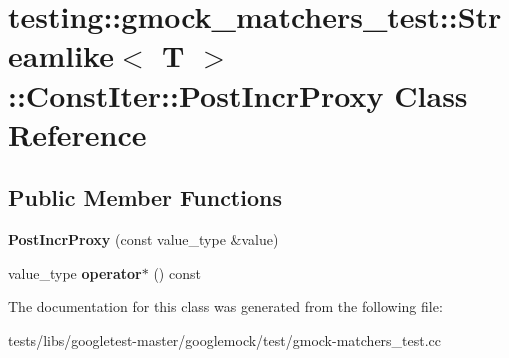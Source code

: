 \hypertarget{classtesting_1_1gmock__matchers__test_1_1Streamlike_1_1ConstIter_1_1PostIncrProxy}{}\section{testing\+:\+:gmock\+\_\+matchers\+\_\+test\+:\+:Streamlike$<$ T $>$\+:\+:Const\+Iter\+:\+:Post\+Incr\+Proxy Class Reference}
\label{classtesting_1_1gmock__matchers__test_1_1Streamlike_1_1ConstIter_1_1PostIncrProxy}
\subsection*{Public Member Functions}
\begin{DoxyCompactItemize}
\item 
\mbox{\label{classtesting_1_1gmock__matchers__test_1_1Streamlike_1_1ConstIter_1_1PostIncrProxy_a1915f8db9943b0a995c4e01d6120fc80}} 
{\bfseries Post\+Incr\+Proxy} (const value\+\_\+type \&value)
\item 
\mbox{\label{classtesting_1_1gmock__matchers__test_1_1Streamlike_1_1ConstIter_1_1PostIncrProxy_a7d5416380b6b6cec0d0ed5b5c9be17b3}} 
value\+\_\+type {\bfseries operator$\ast$} () const
\end{DoxyCompactItemize}


The documentation for this class was generated from the following file\+:\begin{DoxyCompactItemize}
\item 
tests/libs/googletest-\/master/googlemock/test/gmock-\/matchers\+\_\+test.\+cc\end{DoxyCompactItemize}
